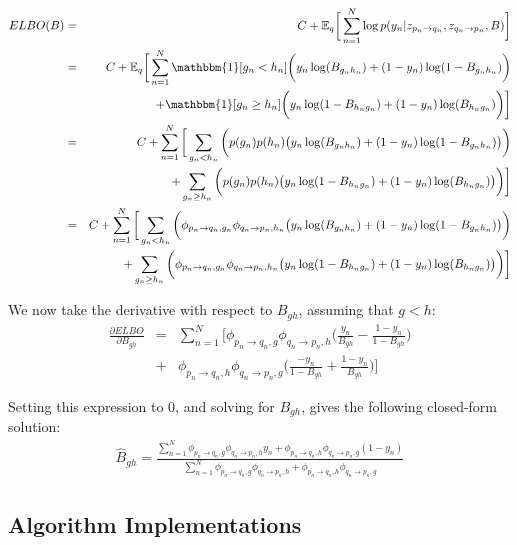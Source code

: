 \begin{eqnarray*}
ELBO(B) &=& C + \mathbb{E}_q\bigg[\sum_{n=1}^N \log p(y_n | z_{p_n \rightarrow q_n}, z_{q_n \rightarrow p_n} , B)\bigg] \\
&=& C+ \mathbb{E}_q\bigg[\sum_{n=1}^N \mathbbm{1}[g_n < h_n]\bigg(y_n \log(B_{g_n h_n}) + (1-y_n) \log(1-B_{g_n h_n})\bigg) \\
&&+ \mathbbm{1}[g_n \geq h_n]\bigg(y_n \log(1-B_{h_n g_n}) + (1-y_n) \log(B_{h_n g_n})\bigg) \bigg] \\
&=& C + \sum_{n=1}^N \bigg[ \sum_{g_n < h_n}\bigg( p(g_n)p(h_n) \big(y_n \log(B_{g_n h_n}) + (1-y_n) \log(1-B_{g_n h_n})\big) \bigg) \\
&&+  \sum_{g_n \geq h_n}\bigg( p(g_n)p(h_n) \big( y_n \log(1-B_{h_n g_n}) + (1-y_n) \log(B_{h_n g_n}) \big) \bigg) \bigg] \\
&=& C + \sum_{n=1}^N \bigg[ \sum_{g_n < h_n}\bigg( \phi_{p_n \rightarrow q_n, g_n} \phi_{q_n \rightarrow p_n, h_n} \big(y_n \log(B_{g_n h_n}) + (1-y_n) \log(1-B_{g_n h_n})\big) \bigg) \\
&&+  \sum_{g_n \geq h_n}\bigg( \phi_{p_n \rightarrow q_n, g_n} \phi_{q_n \rightarrow p_n, h_n} \big( y_n \log(1-B_{h_n g_n}) + (1-y_n) \log(B_{h_n g_n}) \big) \bigg) \bigg] 
\end{eqnarray*}

We now take the derivative with respect to $B_{gh}$, assuming that $g < h$:
\begin{eqnarray*}
\frac{\partial ELBO}{\partial B_{gh}} &=& \sum_{n=1}^N \bigg[ 
\phi_{p_n \rightarrow q_n, g} \phi_{q_n \rightarrow p_n, h} \bigg(\frac{y_n}{B_{gh}} - \frac{1-y_n}{1-B_{gh}}\bigg) \\
&+& \phi_{p_n \rightarrow q_n, h} \phi_{q_n \rightarrow p_n, g} \bigg(\frac{-y_n}{1-B_{gh}} + \frac{1-y_n}{B_{gh}}\bigg) \bigg]
\end{eqnarray*}

Setting this expression to $0$, and solving for $B_{gh}$, gives the following closed-form solution:
\begin{eqnarray*}
\hat{B}_{gh} = \frac{\sum_{n=1}^N \phi_{p_n \rightarrow q_n, g} \phi_{q_n \rightarrow p_n, h} y_n + \phi_{p_n \rightarrow q_n, h} \phi_{q_n \rightarrow p_n, g}(1-y_n)}{\sum_{n=1}^N \phi_{p_n \rightarrow q_n, g} \phi_{q_n \rightarrow p_n, h} + \phi_{p_n \rightarrow q_n, h} \phi_{q_n \rightarrow p_n, g}}
\end{eqnarray*}

\subsection{Algorithm Implementations}
\label{sec:implementation}

